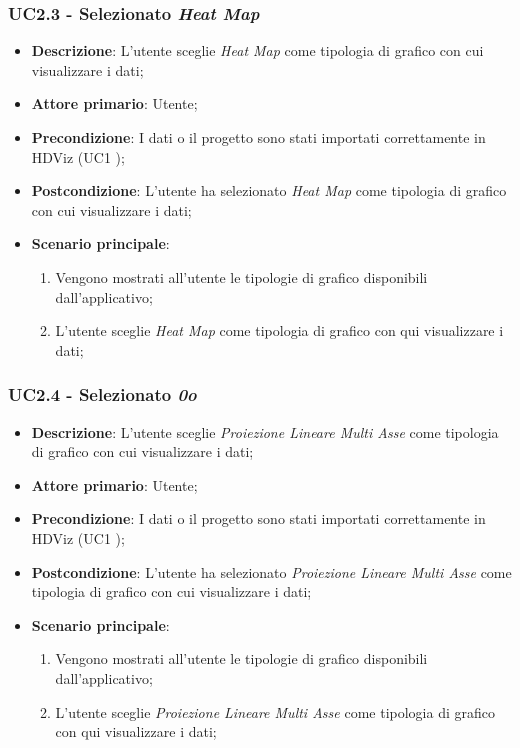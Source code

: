 \subsubsection{UC2.3 - Selezionato \emph{Heat Map}}
\label{ssub:uc2.3}

	\begin{itemize}
		\item \textbf{Descrizione}: L'utente sceglie \emph{Heat Map} come tipologia di grafico con cui visualizzare i dati;
		\item \textbf{Attore primario}: Utente;
		\item \textbf{Precondizione}: I dati o il progetto sono stati importati correttamente in HDViz (UC1 );
		\item \textbf{Postcondizione}: L'utente ha selezionato \emph{Heat Map} come tipologia di grafico con cui visualizzare i dati;
		\item \textbf{Scenario principale}:
			\begin{enumerate}
				\item Vengono mostrati all'utente le tipologie di grafico disponibili dall'applicativo;
				\item L'utente sceglie \emph{Heat Map} come tipologia di grafico con qui visualizzare i dati;
			\end{enumerate}
	\end{itemize}

\subsubsection{UC2.4 - Selezionato \emph{0o}}
\label{ssub:uc2.4}

	\begin{itemize}
		\item \textbf{Descrizione}: L'utente sceglie \emph{Proiezione Lineare Multi Asse} come tipologia di grafico con cui visualizzare i dati;
		\item \textbf{Attore primario}: Utente;
		\item \textbf{Precondizione}: I dati o il progetto sono stati importati correttamente in HDViz (UC1 );
		\item \textbf{Postcondizione}: L'utente ha selezionato \emph{Proiezione Lineare Multi Asse} come tipologia di grafico con cui visualizzare i dati;
		\item \textbf{Scenario principale}:
			\begin{enumerate}
				\item Vengono mostrati all'utente le tipologie di grafico disponibili dall'applicativo;
				\item L'utente sceglie \emph{Proiezione Lineare Multi Asse} come tipologia di grafico con qui visualizzare i dati;
			\end{enumerate}
	\end{itemize}